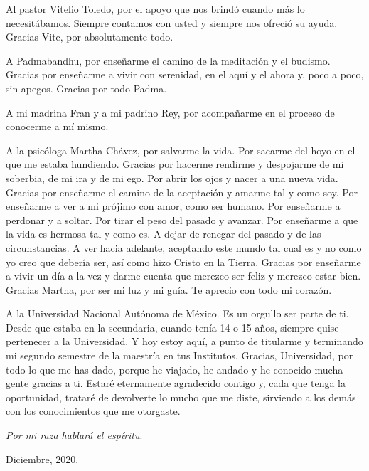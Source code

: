 Al pastor Vitelio Toledo, por el apoyo que nos brindó cuando más lo necesitábamos. Siempre contamos con usted y siempre nos ofreció su ayuda. Gracias Vite, por absolutamente todo. 


A Padmabandhu, por enseñarme el camino de la meditación y el budismo. Gracias por enseñarme a vivir con serenidad, en el aquí y el ahora y, poco a poco, sin apegos. Gracias por todo Padma. 


A mi madrina Fran y a mi padrino Rey, por acompañarme en el proceso de conocerme a mí mismo.


A la psicóloga Martha Chávez, por salvarme la vida. Por sacarme del hoyo en el que me estaba hundiendo. Gracias por hacerme rendirme y despojarme de mi soberbia, de mi ira y de mi ego. Por abrir los ojos y nacer a una nueva vida. Gracias por enseñarme el camino de la aceptación y amarme tal y como soy. Por enseñarme a ver a mi prójimo con amor, como ser humano. Por enseñarme a perdonar y a soltar. Por tirar el peso del pasado y avanzar. Por enseñarme a que la vida es hermosa tal y como es. A dejar de renegar del pasado y de las circunstancias. A ver hacia adelante, aceptando este mundo tal cual es y no como yo creo que debería ser, así como hizo Cristo en la Tierra. Gracias por enseñarme a vivir un día a la vez y darme cuenta que merezco ser feliz y merezco estar bien. Gracias Martha, por ser mi luz y mi guía. Te aprecio con todo mi corazón.


A la Universidad Nacional Autónoma de México. Es un orgullo ser parte de ti. Desde que estaba en la secundaria, cuando tenía 14 o 15 años, siempre quise pertenecer a la Universidad. Y hoy estoy aquí, a punto de titularme y terminando mi segundo semestre de la maestría en tus Institutos. Gracias, Universidad, por todo lo que me has dado, porque he viajado, he andado y he conocido mucha gente gracias a ti. Estaré eternamente agradecido contigo y, cada que tenga la oportunidad, trataré de devolverte lo mucho que me diste, sirviendo a los demás con los conocimientos que me otorgaste.

\begin{flushright}
\textit{Por mi raza hablará el espíritu}.

Diciembre, 2020.

\end{flushright}










